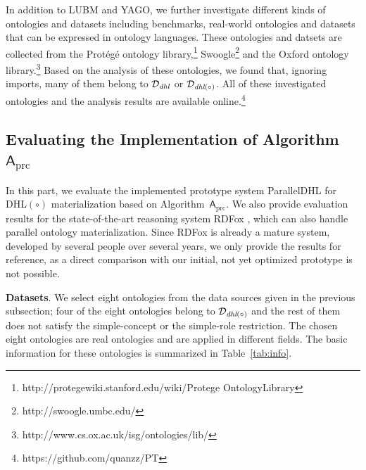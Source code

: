 In addition to LUBM and YAGO, we further investigate different kinds of ontologies and datasets
including benchmarks, real-world ontologies and datasets that can be
expressed in ontology languages.
These ontologies and datsets are collected from the Prot\'{e}g\'{e}
ontology
library,\footnote{http://protegewiki.stanford.edu/wiki/Protege\textunderscore
  Ontology\textunderscore Library}
Swoogle\footnote{http://swoogle.umbc.edu/} and the Oxford ontology library.\footnote{http://www.cs.ox.ac.uk/isg/ontologies/lib/}
Based on the analysis of these ontologies, we found that, ignoring imports, many of them
belong to $\mathcal{D}_{\textit{\text{dhl}}}$ or $\mathcal{D}_{\textit{\text{dhl}}(\circ)}$.
All of these investigated ontologies and the analysis results are available online.\footnote{https://github.com/quanzz/PT}


\subsection{Evaluating the Implementation of Algorithm~$\mathsf{A}_{\text{prc}}$}

In this part, we evaluate the implemented prototype system ParallelDHL
for DHL$(\circ)$ materialization based on
Algorithm~$\mathsf{A}_{\text{prc}}$. We also provide evaluation
results for the state-of-the-art reasoning system RDFox
\cite{MotikNPHO14}, which can also handle parallel ontology
materialization. Since RDFox is already a mature system, developed by
several people over several years, we only provide the results for
reference, as a direct comparison with our initial, not yet optimized
prototype is not possible.

\textbf{Datasets}.
We select eight ontologies from the data sources given in the previous subsection;
four of the eight ontologies belong to $\mathcal{D}_{\textit{\text{dhl}}(\circ)}$ and
the rest of them does not satisfy the simple-concept or the simple-role
restriction.
The chosen eight ontologies are real ontologies and are applied in different fields.
The basic information for these ontologies
is summarized in Table~\ref{tab:info}.

